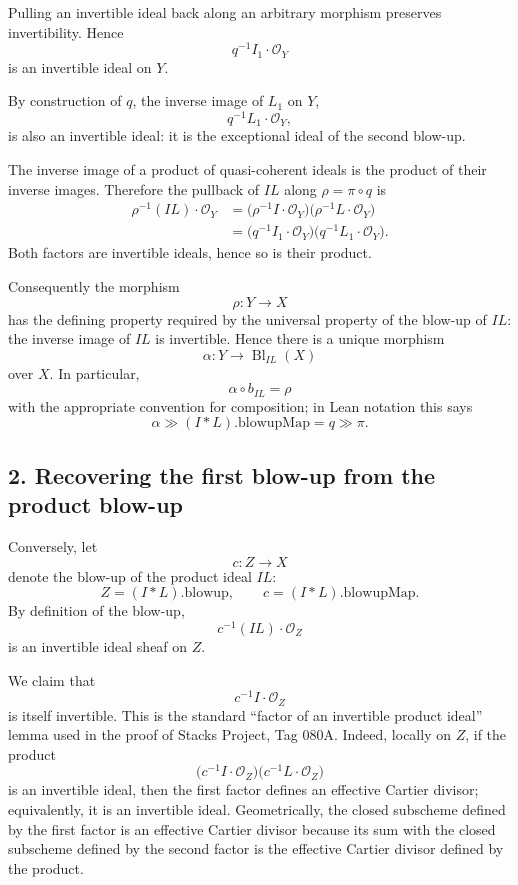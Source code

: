 \documentclass[11pt]{article}
\newcommand{\OO}{\mathcal O}
\newcommand{\Bl}{\operatorname{Bl}}
\begin{document}
Pulling an invertible ideal back along an arbitrary morphism preserves
invertibility.  Hence
\[
  q^{-1}I_1\cdot\OO_Y
\]
is an invertible ideal on \(Y\).

By construction of \(q\), the inverse image of \(L_1\) on \(Y\),
\[
  q^{-1}L_1\cdot\OO_Y,
\]
is also an invertible ideal: it is the exceptional ideal of the second
blow-up.

The inverse image of a product of quasi-coherent ideals is the product of
their inverse images.  Therefore the pullback of \(I L\) along
\(\rho=\pi\circ q\) is
\[
\begin{aligned}
  \rho^{-1}(I L)\cdot\OO_Y
  &=
  \bigl(\rho^{-1}I\cdot\OO_Y\bigr)
  \bigl(\rho^{-1}L\cdot\OO_Y\bigr)\\
  &=
  \bigl(q^{-1}I_1\cdot\OO_Y\bigr)
  \bigl(q^{-1}L_1\cdot\OO_Y\bigr).
\end{aligned}
\]
Both factors are invertible ideals, hence so is their product.

Consequently the morphism
\[
  \rho:Y\longrightarrow X
\]
has the defining property required by the universal property of the
blow-up of \(I L\): the inverse image of \(I L\) is invertible.  Hence there
is a unique morphism
\[
  \alpha:
  Y\longrightarrow \Bl_{I L}(X)
\]
over \(X\).  In particular,
\[
  \alpha\circ b_{I L}=\rho
\]
with the appropriate convention for composition; in Lean notation this
says
\[
  \alpha \gg (I*L).\mathrm{blowupMap}
  =
  q\gg\pi.
\]

\subsection*{2. Recovering the first blow-up from the product blow-up}

Conversely, let
\[
  c:Z\longrightarrow X
\]
denote the blow-up of the product ideal \(I L\):
\[
  Z=(I*L).\mathrm{blowup},
  \qquad
  c=(I*L).\mathrm{blowupMap}.
\]
By definition of the blow-up,
\[
  c^{-1}(I L)\cdot\OO_Z
\]
is an invertible ideal sheaf on \(Z\).

We claim that
\[
  c^{-1}I\cdot\OO_Z
\]
is itself invertible.  This is the standard ``factor of an invertible
product ideal'' lemma used in the proof of Stacks Project, Tag 080A.
Indeed, locally on \(Z\), if the product
\[
  \bigl(c^{-1}I\cdot\OO_Z\bigr)
  \bigl(c^{-1}L\cdot\OO_Z\bigr)
\]
is an invertible ideal, then the first factor defines an effective Cartier
divisor; equivalently, it is an invertible ideal.  Geometrically, the
closed subscheme defined by the first factor is an effective Cartier
divisor because its sum with the closed subscheme defined by the second
factor is the effective Cartier divisor defined by the product.
\end{document}
